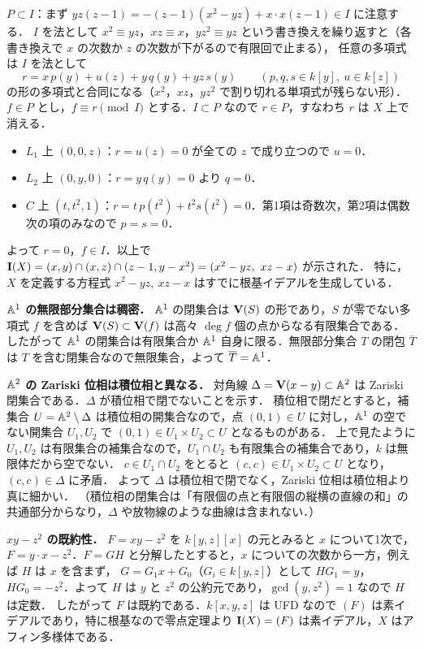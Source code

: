 $P\subset I$：まず $yz(z-1)=-(z-1)(x^2-yz)+x\cdot x(z-1)\in I$ に注意する．
$I$ を法として $x^2\equiv yz$，$xz\equiv x$，$yz^2\equiv yz$ という書き換えを繰り返すと（各書き換えで $x$ の次数か $z$ の次数が下がるので有限回で止まる），
任意の多項式は $I$ を法として
\[
  r=x\,p(y)+u(z)+y\,q(y)+yz\,s(y)\qquad(p,q,s\in k[y],\ u\in k[z])
\]
の形の多項式と合同になる（$x^2$，$xz$，$yz^2$ で割り切れる単項式が残らない形）．
$f\in P$ とし，$f\equiv r\pmod I$ とする．$I\subset P$ なので $r\in P$，すなわち $r$ は $X$ 上で消える．
\begin{itemize}
  \item $L_1$ 上 $(0,0,z)$：$r=u(z)=0$ が全ての $z$ で成り立つので $u=0$．
  \item $L_2$ 上 $(0,y,0)$：$r=y\,q(y)=0$ より $q=0$．
  \item $C$ 上 $(t,t^2,1)$：$r=t\,p(t^2)+t^2s(t^2)=0$．第1項は奇数次，第2項は偶数次の項のみなので $p=s=0$．
\end{itemize}
よって $r=0$，$f\in I$．以上で $\Ideal(X)=(x,y)\cap(x,z)\cap(z-1,y-x^2)=(x^2-yz,\ xz-x)$ が示された．
特に，$X$ を定義する方程式 $x^2-yz,\ xz-x$ はすでに根基イデアルを生成している．

\textbf{$\mathbb{A}^1$ の無限部分集合は稠密．}
$\mathbb{A}^1$ の閉集合は $\mathbf{V}(S)$ の形であり，$S$ が零でない多項式 $f$ を含めば $\mathbf{V}(S)\subset\mathbf{V}(f)$ は高々 $\deg f$ 個の点からなる有限集合である．
したがって $\mathbb{A}^1$ の閉集合は有限集合か $\mathbb{A}^1$ 自身に限る．無限部分集合 $T$ の閉包 $\overline T$ は $T$ を含む閉集合なので無限集合，よって $\overline T=\mathbb{A}^1$．

\textbf{$\mathbb{A}^2$ の Zariski 位相は積位相と異なる．}
対角線 $\Delta=\mathbf{V}(x-y)\subset\mathbb{A}^2$ は Zariski 閉集合である．$\Delta$ が積位相で閉でないことを示す．
積位相で閉だとすると，補集合 $U=\mathbb{A}^2\setminus\Delta$ は積位相の開集合なので，点 $(0,1)\in U$ に対し，$\mathbb{A}^1$ の空でない開集合 $U_1,U_2$ で $(0,1)\in U_1\times U_2\subset U$ となるものがある．
上で見たように $U_1,U_2$ は有限集合の補集合なので，$U_1\cap U_2$ も有限集合の補集合であり，$k$ は無限体だから空でない．
$c\in U_1\cap U_2$ をとると $(c,c)\in U_1\times U_2\subset U$ となり，$(c,c)\in\Delta$ に矛盾．
よって $\Delta$ は積位相で閉でなく，Zariski 位相は積位相より真に細かい．
（積位相の閉集合は「有限個の点と有限個の縦横の直線の和」の共通部分からなり，$\Delta$ や放物線のような曲線は含まれない．）

\textbf{$xy-z^2$ の既約性．}
$F=xy-z^2$ を $k[y,z][x]$ の元とみると $x$ について1次で，$F=y\cdot x-z^2$．$F=GH$ と分解したとすると，$x$ についての次数から一方，例えば $H$ は $x$ を含まず，
$G=G_1x+G_0$（$G_i\in k[y,z]$）として $HG_1=y$，$HG_0=-z^2$．よって $H$ は $y$ と $z^2$ の公約元であり，$\gcd(y,z^2)=1$ なので $H$ は定数．
したがって $F$ は既約である．$k[x,y,z]$ は UFD なので $(F)$ は素イデアルであり，特に根基なので零点定理より $\mathbf{I}(X)=(F)$ は素イデアル，$X$ はアフィン多様体である．

